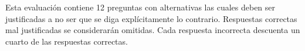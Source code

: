 \vspace{0.025\textwidth}

Esta evaluaci\'on contiene 12 preguntas con alternativas las cuales deben ser justificadas a no ser que se diga expl\'icitamente lo contrario. Respuestas correctas mal justificadas se considerar\'an omitidas. Cada respuesta incorrecta descuenta un cuarto de las respuestas correctas.